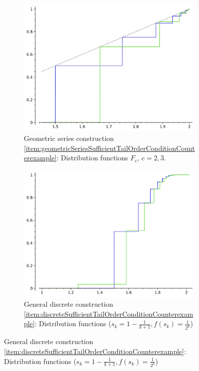 \documentclass[a4paper]{scrreprt}
\begin{document}
\begin{ex}
\begin{enumerate}
            \begin{figure}
                \centering
                \begin{subfigure}[b]{0.49\textwidth}
                    \includegraphics[width=\textwidth]{Pictures/geometric-series-distribution-2-3-half.png}
                    \caption{Geometric series construction \ref{item:geometricSeriesSufficientTailOrderConditionCounterexample}: Distribution functions $F_c$, $c=2, 3$.}
                    \label{fig:distributionsGeometricSeriesCounterexample-2-3}
                \end{subfigure}
                \begin{subfigure}[b]{0.49\textwidth}
                    \includegraphics[width=\textwidth]{Pictures/little-shifts-distribution.png}
                    \caption{General discrete construction \ref{item:discreteSufficientTailOrderConditionCounterexample}: Distribution functions ($s_k = 1-\frac{1}{k+1}, f(s_k) = \frac{1}{2^k}$)}
                    \label{fig:littleShiftsCounterexample-distribution}
                \end{subfigure}
                

\end{figure}
\end{enumerate}
\end{ex}
\end{document}
